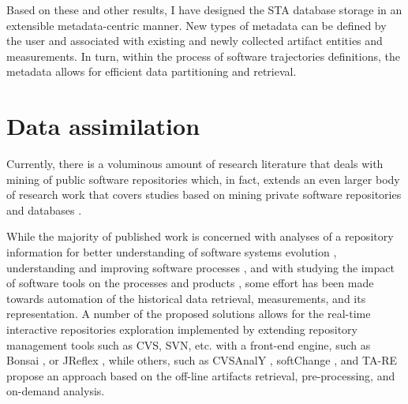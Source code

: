 Based on these and other results, I have designed the STA database storage in an extensible metadata-centric manner. 
New types of metadata can be defined by the user and associated with existing and newly collected artifact entities 
and measurements. In turn, within the process of software trajectories definitions, the metadata allows for efficient 
data partitioning and retrieval.

\section{Data assimilation}
Currently, there is a voluminous amount of research literature that deals with mining of public software repositories 
\cite{citeulike:2710928} which, in fact, extends an even larger body of research work that covers studies based on mining 
private software repositories and databases \cite{citeulike:393158} \cite{citeulike:13125375} \cite{citeulike:13125481}.

While the majority of published work is concerned with analyses of a repository information 
for better understanding of software systems evolution \cite{citeulike:277045} \cite{citeulike:4000311}, 
understanding and improving software processes \cite{citeulike:5803126}, 
and with studying the impact of software tools on the processes and products \cite{citeulike:13125389},
some effort has been made towards automation of the historical data retrieval, measurements, and its representation. 
A number of the proposed solutions allows for the real-time interactive repositories exploration implemented by extending 
repository management tools such as CVS, SVN, etc. with a front-end engine, such as Bonsai \cite{bonsai},
or JReflex \cite{citeulike:3017440}, while others, such as CVSAnalY \cite{citeulike:6544724}, 
softChange \cite{citeulike:13125395}, and {TA}-{RE} \cite{citeulike:4000311} propose an approach based on 
the off-line artifacts retrieval, pre-processing, and on-demand analysis.

